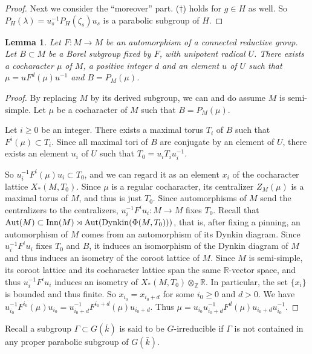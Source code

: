 \documentclass[10pt,a4paper,twoside]{article}
\newtheorem{lem}{Lemma}
\begin{document}
\begin{proof}
Next we consider the ``moreover'' part.
($\dagger$) holds for $g\in H$ as well.
So $P_H(\lambda) = u_s^{-1} P_H(\zeta_s) u_s$ is a parabolic subgroup of $H$.
\end{proof}


\begin{lem}
\label{lem:F-finiteness}
Let $F: M \to M$ be an automorphism of a connected reductive group.
Let $B\subset M$ be a Borel subgroup fixed by $F$, with unipotent radical $U$.
There exists a cocharacter $\mu$ of $M$, a positive integer $d$ and an element $u$ of $U$
such that $\mu = u F^d(\mu) u^{-1}$ and $B=P_M(\mu)$.
\end{lem}

\begin{proof}
By replacing $M$ by its derived subgroup, we can and do assume $M$ is semi-simple.
Let $\mu$ be a cocharacter of $M$
such that $B=P_M(\mu)$.


Let $i\ge 0$ be an integer.
There exists a maximal torus $T_i$ of $B$ such that $F^i(\mu)\subset T_i$.
Since all maximal tori of $B$ are conjugate by an element of $U$,
there exists an element $u_i$ of $U$ such that $T_0 = u_i T_i u_i^{-1}$.

So $u_i^{-1}F^i(\mu) u_i \subset T_0$,
and we can regard it as an element $x_i$ of the cocharacter lattice $X_*(M, T_0)$.
Since $\mu$ is a regular cocharacter, its centralizer $Z_M(\mu)$ is a maximal torus of $M$, and thus is just $T_0$.
Since automorphisms of $M$ send the centralizers to the centralizers,
$u_i^{-1} F^i u_i : M \to M$ fixes $T_0$.
Recall that $\operatorname{Aut}(M)\subset \operatorname{Inn}(M) \rtimes \operatorname{Aut}(\operatorname{Dynkin}(\Phi(M, T_0)))$, that is, after fixing a pinning,
an automorphism of $M$ comes from an automorphism of its Dynkin diagram.
Since $u_i^{-1} F^i u_i$ fixes $T_0$ and $B$,
it induces an isomorphism of the Dynkin diagram of $M$
and thus induces an isometry of the coroot lattice of $M$.
Since $M$ is semi-simple,
its coroot lattice and its cocharacter lattice span the same $\mathbb{R}$-vector space, and thus
$u_i^{-1} F^i u_i$ 
induces an isometry of $X_*(M, T_0)\otimes_{\mathbb{Z}}\mathbb{R}$.
In particular, the set $\{x_i\}$ is bounded and thus finite.
So $x_{i_0} = x_{i_0+d}$ for some $i_0 \ge 0$ and $d>0$.
We have $u_{i_0}^{-1}F^{i_0}(\mu) u_{i_0} = u_{i_0+d}^{-1}F^{i_0+d}(\mu) u_{i_0+d}$.
Thus $\mu = u_{i_0}u_{i_0+d}^{-1}F^d(\mu)u_{i_0+d}u_{i_0}^{-1}$.
\end{proof}

Recall a subgroup $\Gamma \subset G(\bar k)$ is said to be $G$-irreducible if
$\Gamma$ is not contained in any proper parabolic subgroup of $G(\bar k)$.
\end{document}
